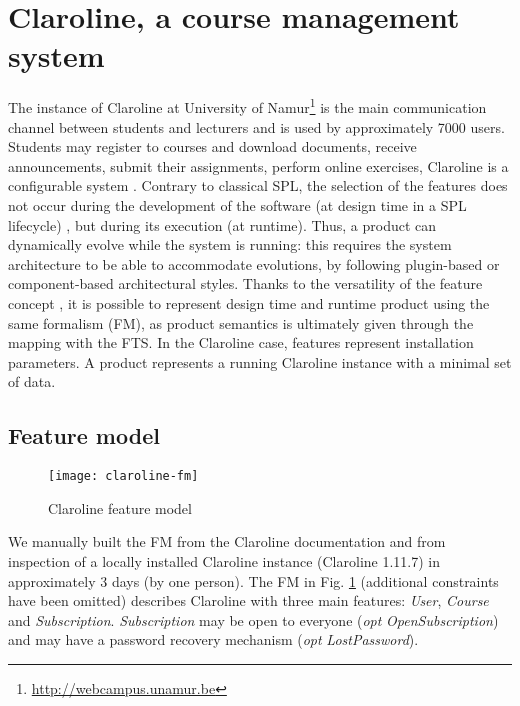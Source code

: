 \section{Claroline, a course management system}

\label{sec:casestudy:claroline}

The instance of Claroline at University of Namur\footnote{\url{http://webcampus.unamur.be}} is the main communication channel between students and lecturers and is used by approximately 7000 users. Students may register to courses and download documents, receive announcements, submit their assignments, perform online exercises, \etc 
Claroline is a configurable system \cite{Cohen2008}. Contrary to classical SPL, the selection of the features does not occur during the development of the software (at design time in a SPL lifecycle) \cite{Pohl2005}, but during its execution (at runtime). Thus, a product can dynamically evolve while the system is running: this requires the system architecture to be able to accommodate evolutions, by following plugin-based or component-based architectural styles. Thanks to the versatility of the feature concept \cite{Classen2008}, it is possible to represent design time and runtime product using the same formalism (FM), as product semantics is ultimately given through the mapping with the FTS. In the Claroline case, features represent installation parameters. A product represents a running Claroline instance with a minimal set of data.  

\subsection{Feature model} 

\label{sec:casestudy:claroline:fm}

\begin{figure}
\centering
\texttt{[image: claroline-fm]}
\caption{Claroline feature model}
\label{fig:clarolinefm}
\end{figure}

We manually built the \gls{FM} from the Claroline documentation and from inspection of a locally installed Claroline instance (Claroline 1.11.7) in approximately 3 days (by one person). The FM in Fig. \ref{fig:clarolinefm} (additional constraints have been omitted) describes Claroline with three main features: \textit{User}, \textit{Course} and \textit{Subscription}. \textit{Subscription} may be open to everyone (\textit{opt} \textit{OpenSubscription}) and may have a password recovery mechanism (\textit{opt} \textit{LostPassword}). 

